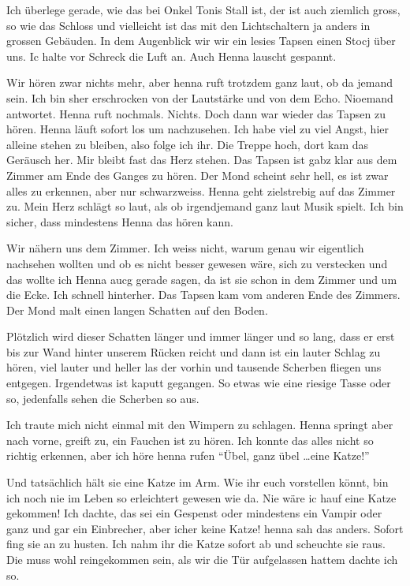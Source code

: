 Ich überlege gerade, wie das bei Onkel Tonis Stall ist, der ist auch ziemlich gross, so wie das Schloss und vielleicht ist das mit den Lichtschaltern ja anders in grossen Gebäuden. In dem Augenblick wir wir ein lesies Tapsen einen Stocj über uns. Ic halte vor Schreck die Luft an. Auch Henna lauscht gespannt.

Wir hören zwar nichts mehr, aber henna ruft trotzdem ganz laut, ob da jemand sein. Ich bin sher erschrocken von der Lautstärke und von dem Echo. Nioemand antwortet. Henna ruft nochmals. Nichts. Doch dann war wieder das Tapsen zu hören. Henna läuft sofort los um nachzusehen. Ich habe viel zu viel Angst, hier alleine stehen zu bleiben, also folge ich ihr. Die Treppe hoch, dort kam das Geräusch her. Mir bleibt fast das Herz stehen. Das Tapsen ist gabz klar aus dem Zimmer am Ende des Ganges zu hören. Der Mond scheint sehr hell, es ist zwar alles zu erkennen, aber nur schwarzweiss. Henna geht zielstrebig auf das Zimmer zu. Mein Herz schlägt so laut, als ob irgendjemand ganz laut Musik spielt. Ich bin sicher, dass mindestens Henna das hören kann. 

Wir nähern uns dem Zimmer. Ich weiss nicht, warum genau wir eigentlich nachsehen wollten und ob es nicht besser gewesen wäre, sich zu verstecken und das wollte ich Henna aucg gerade sagen, da ist sie schon in dem Zimmer und um die Ecke. Ich schnell hinterher. Das Tapsen kam vom anderen Ende des Zimmers. Der Mond malt einen langen Schatten auf den Boden.

Plötzlich wird dieser Schatten länger und immer länger und so lang, dass er erst bis zur Wand hinter unserem Rücken reicht und dann ist ein lauter Schlag zu hören, viel lauter und heller las der vorhin und tausende Scherben fliegen uns entgegen. Irgendetwas ist kaputt gegangen. So etwas wie eine riesige Tasse oder so, jedenfalls sehen die Scherben so aus.

Ich traute mich nicht einmal mit den Wimpern zu schlagen. Henna springt aber nach vorne, greift zu, ein Fauchen ist zu hören. Ich konnte das alles nicht so richtig erkennen, aber ich höre henna rufen \enquote{Übel, ganz übel \dots eine Katze!}

Und tatsächlich hält sie eine Katze im Arm. Wie ihr euch vorstellen könnt, bin ich noch nie im Leben so erleichtert gewesen wie da. Nie wäre ic hauf eine Katze gekommen! Ich dachte, das sei ein Gespenst oder mindestens ein Vampir oder ganz und gar ein Einbrecher, aber icher keine Katze! henna sah das anders. Sofort fing sie an zu husten. Ich nahm ihr die Katze sofort ab und scheuchte sie raus. Die muss wohl reingekommen sein, als wir die Tür aufgelassen hattem dachte ich so.

